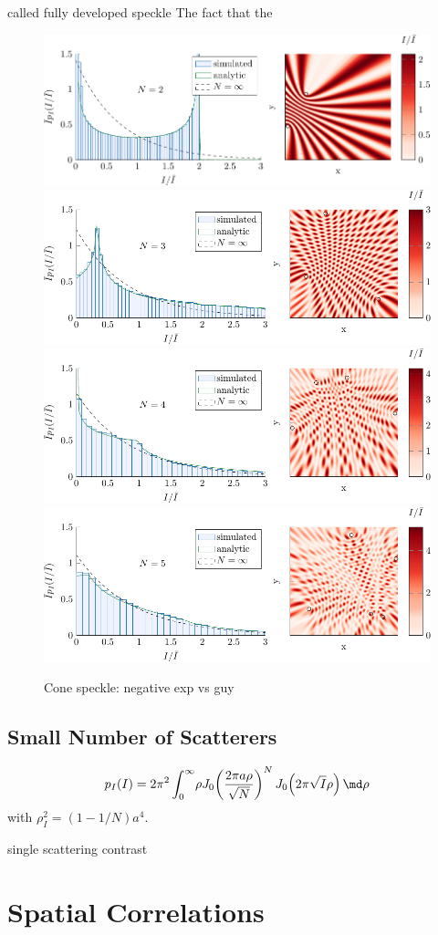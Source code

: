 called fully developed speckle
The fact that the 

\begin{figure}
\centering
\includegraphics[keepaspectratio]{figures/speckle_lowscatthist/spk_hist_2.pdf}
\includegraphics[keepaspectratio]{figures/speckle_lowscatthist/spk_hist_3.pdf}
\includegraphics[keepaspectratio]{figures/speckle_lowscatthist/spk_hist_4.pdf}
\includegraphics[keepaspectratio]{figures/speckle_lowscatthist/spk_hist_5.pdf}
\caption{Cone speckle: negative exp vs guy}
\end{figure}

\subsection{Small Number of Scatterers}
\begin{equation}
p_I(I) = 2\pi^2 \int_0^\infty\! \rho J_0\!\left(\frac{2\pi a
\rho}{\sqrt{N}}\right)^N J_0\!\left(2\pi\sqrt{I}\rho\right)\md\rho
\end{equation}
with $\rho_I^2=(1-1/N)a^4$.

single scattering
contrast

\section{Spatial Correlations}


